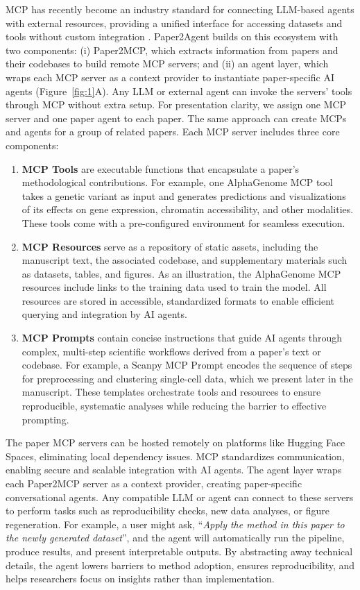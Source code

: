 \documentclass[11pt]{article}
\begin{document}
MCP has recently become an industry standard for connecting LLM-based agents with external resources, providing a unified interface for accessing datasets and tools without custom integration \citep{hou2025model}. Paper2Agent builds on this ecosystem with two components: (i) Paper2MCP, which extracts information from papers and their codebases to build remote MCP servers; and (ii) an agent layer, which wraps each MCP server as a context provider to instantiate paper-specific AI agents (Figure~\ref{fig:1}A). Any LLM or external agent can invoke the servers’ tools through MCP without extra setup. For presentation clarity, we assign one MCP server and one paper agent to each paper. The same approach can create MCPs and agents for a group of related papers. Each MCP server includes three core components:
\begin{enumerate}
    \item \textbf{MCP Tools} are executable functions that encapsulate a paper’s methodological contributions. For example, one AlphaGenome MCP tool takes a genetic variant as input and generates predictions and visualizations of its effects on gene expression, chromatin accessibility, and other modalities. These tools come with a pre-configured environment for seamless execution.
    \item \textbf{MCP Resources} serve as a repository of static assets, including the manuscript text, the associated codebase, and supplementary materials such as datasets, tables, and figures. As an illustration, the AlphaGenome MCP resources include links to the training data used to train the model. All resources are stored in accessible, standardized formats to enable efficient querying and integration by AI agents.
    \item \textbf{MCP Prompts} contain concise instructions that guide AI agents through complex, multi-step scientific workflows derived from a paper’s text or codebase. For example, a Scanpy MCP Prompt encodes the sequence of steps for preprocessing and clustering single-cell data, which we present later in the manuscript. These templates orchestrate tools and resources to ensure reproducible, systematic analyses while reducing the barrier to effective prompting.
\end{enumerate}

The paper MCP servers can be hosted remotely on platforms like 
Hugging Face Spaces, eliminating local dependency issues. MCP standardizes communication, enabling secure and scalable integration with AI agents. The agent layer wraps each Paper2MCP server as a context provider, creating paper-specific conversational agents. Any compatible LLM or agent can connect to these servers to perform tasks such as reproducibility checks, new data analyses, or figure regeneration. For example, a user might ask, “\textit{Apply the method in this paper to the newly generated dataset}”, and the agent will automatically run the pipeline, produce results, and present interpretable outputs. By abstracting away technical details, the agent lowers barriers to method adoption, ensures reproducibility, and helps researchers focus on insights rather than implementation.
\end{document}

